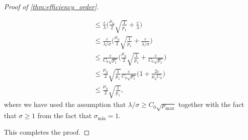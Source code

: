 \documentclass[10pt]{article}
\newcommand{\0}{{\mathbf{0}}}
\newcommand{\1}{{\mathbf{1}}}
\newcommand{\U}{{\mathbf{U}}}
\newcommand{\eps}{\varepsilon}
\begin{document}
\begin{proof}[Proof of \cref{thm:efficiency_order}]
\begin{itemize}
\begin{align*}
       &\leq  \frac{\eps}{\lambda} \bigg( \frac{\mu_0}{2} \sqrt{\frac{1}{p_1}} + \frac{\eps}{\lambda} \bigg) \\
       &\leq \frac{\eps}{\lambda/\sigma}  \bigg( \frac{\mu_0}{2} \sqrt{\frac{1}{p_1}} + \frac{\eps}{\lambda/\sigma} \bigg) \\
       &\leq \frac{\eps}{C_0 \sqrt{p_1}} \bigg( \frac{\mu_0}{2} \sqrt{\frac{1}{p_1}} + \frac{\eps}{C_0 \sqrt{p_1}} \bigg) \\
       &\leq \frac{\mu_0}{2} \sqrt{\frac{1}{p_1}}  \frac{\eps}{C_0 \sqrt{p_1}} \bigg( 1 + \frac{2 \eps}{\mu_0 C_0} \bigg) \\
       &\leq \frac{\mu_0}{2} \sqrt{\frac{1}{p_1}},
    \end{align*}
    where we have used the assumption that $\lambda/\sigma \geq C_0 \sqrt{p_{\max}}$ together with the fact that $\sigma \geq 1$ from the fact that $\sigma_{\min} = 1$.  
\end{itemize}
This completes the proof.

\end{proof}
\end{document}
